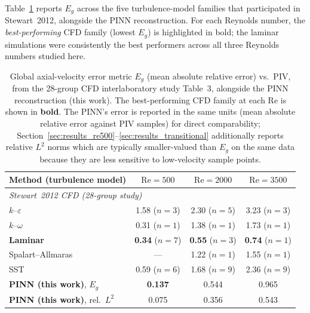 \documentclass[12pt,a4paper]{article}
\newcommand{\Reyn}{\mathrm{Re}}    %
\begin{document}
Table~\ref{tab:cfd_comparison} reports $E_g$ across the five
turbulence-model families that participated in Stewart~2012,
alongside the PINN reconstruction. For each Reynolds number, the
\emph{best-performing} CFD family (lowest $E_g$) is highlighted in
bold; the laminar simulations were consistently the best
performers across all three Reynolds numbers studied here.

\begin{table}[H]
  \centering
  \caption{
    Global axial-velocity error metric $E_g$ (mean absolute
    relative error) vs.\ PIV, from the 28-group CFD
    interlaboratory study \cite{Stewart2012FDA} Table~3, alongside
    the PINN reconstruction (this work). The best-performing CFD
    family at each $\Reyn$ is shown in \textbf{bold}. The PINN's
    error is reported in the same units (mean absolute relative
    error against PIV samples) for direct comparability;
    Section~\ref{sec:results_re500}--\ref{sec:results_transitional}
    additionally reports relative $L^2$ norms which are typically
    smaller-valued than $E_g$ on the same data because they are
    less sensitive to low-velocity sample points.
  }
  \label{tab:cfd_comparison}
  \begin{tabular}{lccc}
    \toprule
    Method (turbulence model)
      & $\Reyn = 500$ & $\Reyn = 2000$ & $\Reyn = 3500$ \\
    \midrule
    \multicolumn{4}{l}{\textit{Stewart~2012 CFD (28-group study)}} \\
    \quad $k$--$\varepsilon$           & 1.58 ($n=3$) & 2.30 ($n=5$) & 3.23 ($n=3$) \\
    \quad $k$--$\omega$                & 0.31 ($n=1$) & 1.38 ($n=1$) & 1.73 ($n=1$) \\
    \quad \textbf{Laminar}             & \textbf{0.34} ($n=7$) & \textbf{0.55} ($n=3$) & \textbf{0.74} ($n=1$) \\
    \quad Spalart--Allmaras            & ---          & 1.22 ($n=1$) & 1.55 ($n=1$) \\
    \quad SST                          & 0.59 ($n=6$) & 1.68 ($n=9$) & 2.36 ($n=9$) \\
    \midrule
    \textbf{PINN (this work)}, $E_g$   & \textbf{0.137}
                                       & 0.544
                                       & 0.965 \\
    \textbf{PINN (this work)}, rel.\ $L^2$
                                       & 0.075 & 0.356 & 0.543 \\
    \bottomrule
  \end{tabular}
\end{table}
\end{document}
